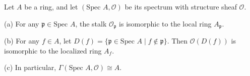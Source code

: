 Let $A$ be a ring, and let $(\text{Spec } A, \mathcal{O})$ be its spectrum with structure sheaf $\mathcal{O}$.

(a) For any $\mathfrak{p} \in \text{Spec } A$, the stalk $\mathcal{O}_\mathfrak{p}$ is isomorphic to the local ring $A_\mathfrak{p}$.

(b) For any $f \in A$, let $D(f) = \{\mathfrak{p} \in \text{Spec } A \mid f \notin \mathfrak{p}\}$. Then $\mathcal{O}(D(f))$ is isomorphic to the localized ring $A_f$.

(c) In particular, $\Gamma(\text{Spec } A, \mathcal{O}) \cong A$.
